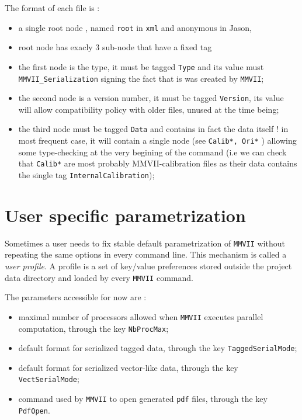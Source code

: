 The format of each file is :

\begin{itemize}
	\item a single root node , named {\tt root} in {\tt xml} and anonymous in Jason,
	\item root node has exacly $3$ sub-node that have  a fixed tag

	\item the first node is the type, it must be tagged {\tt Type} and its value must {\tt MMVII\_Serialization} 
              signing the fact that is was created by {\tt MMVII};

      \item the second node is a version number, it must be tagged {\tt Version}, its value will allow
	    compatibility policy with older files, unused at the time being;
             
    \item the third node must be tagged {\tt Data} and contains in fact the data itself !
          in most frequent case, it will contain a single node (see {\tt Calib*, Ori*} ) allowing
          some type-checking at the very begining   of the command (i.e we can check that {\tt Calib*}
          are most probably  MMVII-calibration files as their data contains the single tag {\tt InternalCalibration});
\end{itemize}




\section{User specific parametrization}

\label{UserParametrisation}

Sometimes a user needs to fix stable default parametrization of {\tt MMVII}
without repeating the same options in every command line. This mechanism is
called a \emph{user profile}. A profile is a set of key/value preferences stored
outside the project data directory and loaded by every {\tt MMVII} command.

The parameters accessible for now are :

\begin{itemize}
    \item maximal number of processors allowed when {\tt MMVII} executes
          parallel computation, through the key {\tt NbProcMax};

    \item default format for serialized tagged data, through the key
          {\tt TaggedSerialMode};

    \item default format for serialized vector-like data, through the key
          {\tt VectSerialMode};

    \item command used by {\tt MMVII} to open generated {\tt pdf} files, through
          the key {\tt PdfOpen}.
\end{itemize}

